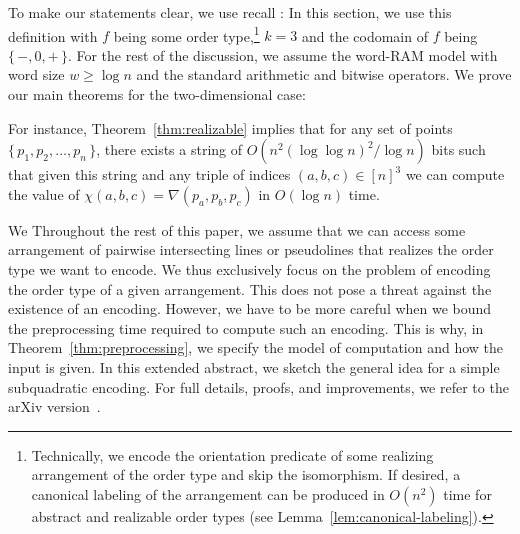 \ifeurocg\else
To make our statements clear, we use recall :
%
\DefinitionEncoding*
%
In this section, we use this definition with \(f\) being some order
type,\footnote{%
  Technically, we encode the orientation predicate of some realizing
  arrangement of the order type and skip the isomorphism. If desired, a
  canonical labeling of the arrangement can be produced in \(O(n^2)\) time for
  abstract and realizable order types (see Lemma~\ref{lem:canonical-labeling}).
}
\(k=3\) and the codomain of \(f\) being \(\{\, -,0,+\,\}\). For the rest of the
discussion, we assume the word-RAM model with word size \(w \geq \log n\) and
the standard arithmetic and bitwise operators.
%
We prove our main theorems for the two-dimensional case:
%
\TheoremGPTAbstract*
\TheoremGPTRealizable*

%
For instance, Theorem~\ref{thm:realizable} implies that for any set of points
\(\{\, p_1, p_2, \ldots, p_n\,\}\), there exists a string of \(O(n^2 {(\log
\log n)}^2 / \log n)\) bits such that given this string and any triple of
indices \((a,b,c) \in {[n]}^3\) we can compute the value of \(\chi(a,b,c) =
\nabla(p_a, p_b, p_c)\) in \(O(\log n)\) time.
\fi

\ifeurocg
We \else
Throughout the rest of this paper, we \fi
assume that we can access some arrangement of pairwise intersecting lines or
pseudolines that realizes the order type we want to encode. We thus exclusively
focus on the problem of encoding the order type of a given arrangement. This
does not pose a threat against the existence of an encoding.
\ifeurocg\else%
However, we have to be more careful when we bound the preprocessing
time required to compute such an encoding. This is why, in
Theorem~\ref{thm:preprocessing}, we specify the model of computation and how
the input is given.
\fi%
\ifeurocg%
In this extended abstract, we sketch the general idea for a simple subquadratic
encoding. For full details, proofs, and improvements, we refer to the arXiv
version~\cite{CCILO18}.
\fi%
